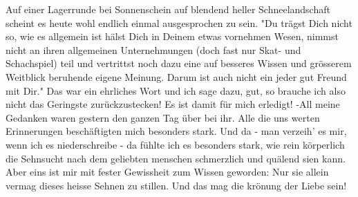 \def\day{26. Februar 1943}
\mktitle

Auf einer Lagerrunde bei Sonnenschein auf blendend heller Schneelandschaft scheint es heute wohl endlich einmal ausgesprochen zu sein.
"Du tr\"{a}gst Dich nicht so, wie es allgemein ist h\"{a}lst Dich in Deinem etwas vornehmen Wesen, nimmst nicht an ihren allgemeinen Unternehmungen (doch fast nur Skat- und Schachspiel) teil und vertrittst noch dazu eine auf besseres Wissen und gr\"{o}sserem Weitblick beruhende eigene Meinung.
Darum ist auch nicht ein jeder gut Freund mit Dir."
Das war ein ehrliches Wort und ich sage dazu, gut, so brauche ich also nicht das Geringste zur\"{u}ckzustecken!
Es ist damit f\"{u}r mich erledigt!
-All meine Gedanken waren gestern den ganzen Tag \"{u}ber bei ihr.
Alle die uns werten Erinnerungen besch\"{a}ftigten mich besonders stark.
Und da - man verzeih' es mir, wenn ich es niederschreibe - da f\"{u}hlte ich es besonders stark, wie rein k\"{o}rperlich die Sehnsucht nach dem geliebten menschen schmerzlich und qu\"{a}lend sien kann.
Aber eins ist mir mit fester Gewissheit zum Wissen geworden: Nur sie allein vermag dieses heisse Sehnen zu stillen.
Und das mag die kr\"{o}nung der Liebe sein!

\clearpage
